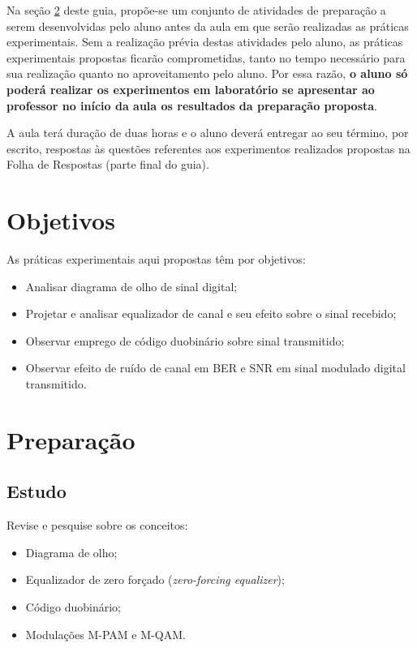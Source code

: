 \documentclass[12pt,addpoints]{exam}
\begin{document}
Na seção \ref{sect:Preparacao} deste guia, propõe-se um conjunto de atividades de preparação a serem desenvolvidas pelo aluno antes da aula em que serão realizadas as práticas experimentais. Sem a realização prévia destas atividades pelo aluno, as práticas experimentais propostas ficarão comprometidas, tanto no tempo necessário para sua realização quanto no aproveitamento pelo aluno. Por essa razão, \textbf{o aluno só poderá realizar os experimentos em laboratório se apresentar ao professor no início da aula os resultados da preparação proposta}. 

A aula terá duração de duas horas e o aluno deverá entregar ao seu término, por escrito, respostas às questões referentes aos experimentos realizados propostas na Folha de Respostas (parte final do guia).

\section{Objetivos}

As práticas experimentais aqui propostas têm por objetivos:
\begin{itemize}
    \item Analisar diagrama de olho de sinal digital;
    \item Projetar e analisar equalizador de canal e seu efeito sobre o sinal recebido;
    \item Observar emprego de código duobinário sobre sinal transmitido;
    \item Observar efeito de ruído de canal em BER e SNR em sinal modulado digital transmitido.
\end{itemize}

\section{Preparação} \label{sect:Preparacao}

\subsection{Estudo}

Revise e pesquise sobre os conceitos:
\begin{itemize}
    \item Diagrama de olho;
    \item Equalizador de zero forçado (\textit{zero-forcing equalizer});
    \item Código duobinário;
    \item Modulações M-PAM e M-QAM.
\end{itemize}
\end{document}
